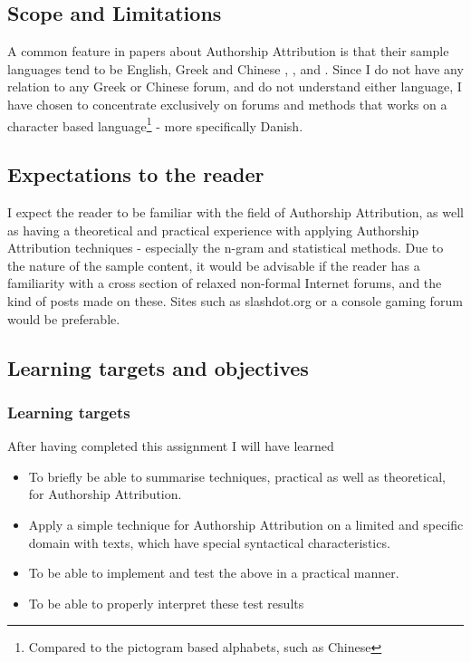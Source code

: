 \subsection{Scope and Limitations}
\label{scope}
A common feature in papers about Authorship Attribution is that their sample languages tend to be English, Greek and Chinese \cite{syntactic}, \cite{nr2}, \cite{nr4} and \cite{app-spe}. Since I do not have any relation to any Greek or Chinese forum, and do not understand either language, I have chosen to concentrate exclusively on forums and methods that works on a character based language\footnote{Compared to the pictogram based alphabets, such as Chinese} - more specifically Danish.

\subsection{Expectations to the reader}
\label{expectations}
I expect the reader to be familiar with the field of Authorship Attribution, as well as having a theoretical and practical experience with applying Authorship Attribution techniques - especially the n-gram and statistical methods. Due to the nature of the sample content, it would be advisable if the reader has a familiarity with a cross section of relaxed non-formal Internet forums, and the kind of posts made on these. Sites such as slashdot.org or a console gaming forum would be preferable.

\subsection{Learning targets and objectives}
\label{learning}
\subsubsection{Learning targets}
After having completed this assignment I will have learned 
\begin{itemize}
\item To briefly be able to summarise techniques, practical as well as theoretical, for Authorship Attribution.
\item Apply a simple technique for Authorship Attribution on a limited and specific domain with texts, which have special syntactical characteristics.
\item To be able to implement and test the above in a practical manner.
\item To be able to properly interpret these test results
\end{itemize}

